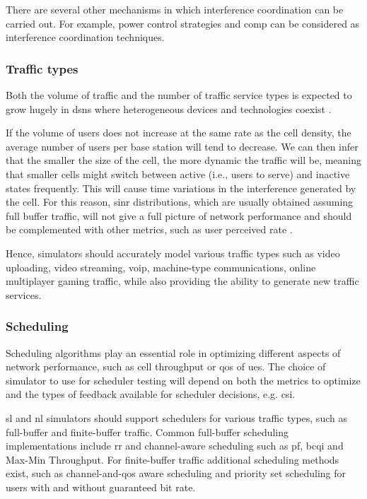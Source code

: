 \documentclass[conference]{IEEEtran}
\begin{document}
There are several other mechanisms in which interference coordination can be carried out. For example, power control strategies and \ac{comp} can be considered as interference coordination techniques.


\subsubsection{Traffic types}\label{subsect:Traffic_types}

Both the volume of traffic and the number of traffic service types is expected to grow hugely in \acp{dsn} where heterogeneous devices and
technologies coexist \cite{Auroux}.

If the volume of users does not increase at the same rate as the cell density, the average number of users per base station will tend to decrease. We can then infer that the smaller the size of the cell, the more dynamic the traffic will be, meaning that smaller cells might switch between active (i.e., users to serve) and inactive states frequently. This will cause time variations in the interference generated by the cell. For this reason, \ac{sinr} distributions, which are usually obtained assuming full buffer traffic, will not give a full picture of network performance and should be complemented with other metrics, such as user perceived rate \cite{Andrews2013}.

Hence, simulators should accurately model various traffic types such as video uploading, video streaming, \ac{voip}, machine-type communications, online multiplayer gaming traffic, while also providing the ability to generate new traffic services.


\subsubsection{Scheduling}\label{subsect:Scheduling} Scheduling algorithms play an essential role in optimizing different aspects of network performance, such as cell throughput or \ac{qos} of \acp{ue}.
The choice of simulator to use for scheduler testing will depend on both the metrics to optimize and the types of feedback available for scheduler decisions, e.g. \ac{csi}.


\ac{sl} and \ac{nl} simulators should support schedulers for various traffic types, such as full-buffer and finite-buffer traffic. Common full-buffer scheduling implementations include \ac{rr} and channel-aware scheduling such as \ac{pf}, \ac{bcqi} and Max-Min Throughput. For finite-buffer traffic additional scheduling methods exist, such as channel-and-\ac{qos} aware scheduling and priority set scheduling for users with and without guaranteed bit rate.
\end{document}
